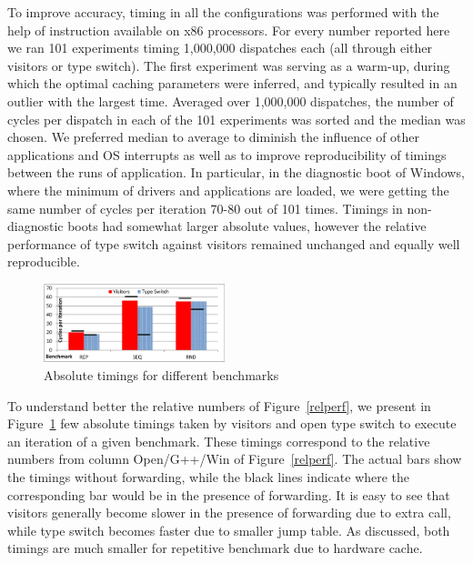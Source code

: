 \noindent
To improve accuracy, timing in all the configurations was performed with the 
help of  instruction available on x86 processors. For every number reported 
here we ran 101 experiments timing 1,000,000 dispatches each (all through either 
visitors or type switch). The first experiment was serving as a warm-up, during 
which the optimal caching parameters were inferred, and typically resulted in an 
outlier with the largest time. Averaged over 1,000,000 dispatches, the number of 
cycles per dispatch in each of the 101 experiments was sorted and the median was 
chosen. We preferred median to average to diminish the influence of other 
applications and OS interrupts as well as to improve reproducibility of timings 
between the runs of application. In particular, in the diagnostic boot of 
Windows, where the minimum of drivers and applications are loaded, we were 
getting the same number of cycles per iteration 70-80 out of 101 times. Timings 
in non-diagnostic boots had somewhat larger absolute values, however the 
relative performance of type switch against visitors remained unchanged and 
equally well reproducible.

\begin{figure}[htbp]
  \centering
    \includegraphics[width=0.47\textwidth]{VisitorsCompare.pdf}
  \caption{Absolute timings for different benchmarks}
  \label{fig:VisitorsComparison}
\end{figure}

To understand better the relative numbers of Figure~\ref{relperf}, we present 
in Figure~\ref{fig:VisitorsComparison} few absolute timings taken by visitors 
and open type switch to execute an iteration of a given benchmark. These timings 
correspond to the relative numbers from column Open/G++/Win of Figure~\ref{relperf}.
The actual bars show the timings without forwarding, while the black lines 
indicate where the corresponding bar would be in the presence of forwarding. It 
is easy to see that visitors generally become slower in the presence of 
forwarding due to extra call, while type switch becomes faster due to smaller 
jump table. As discussed, both timings are much smaller for repetitive benchmark 
due to hardware cache.

